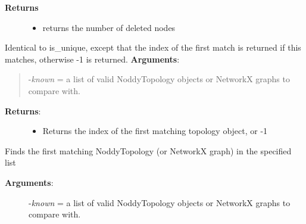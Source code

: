 \documentclass[a4paper,10pt,english]{sphinxmanual}
\begin{document}
\begin{fulllineitems}
\begin{fulllineitems}
\begin{description}
\begin{itemize}
\end{itemize}

\item[{\textbf{Returns}}] \leavevmode\begin{itemize}
\item {} 
returns the number of deleted nodes

\end{itemize}

\end{description}

\end{fulllineitems}


\begin{fulllineitems}
\label{pynoddy:pynoddy.output.NoddyTopology.find_first_match}
Identical to is\_unique, except that the index of the first match is returned if this matches, otherwise
-1 is returned.
\textbf{Arguments}:
\begin{quote}

-\emph{known} = a list of valid NoddyTopology objects or NetworkX graphs to compare with.
\end{quote}
\begin{description}
\item[{\textbf{Returns}:}] \leavevmode\begin{itemize}
\item {} 
Returns the index of the first matching topology object, or -1

\end{itemize}

\end{description}

\end{fulllineitems}


\begin{fulllineitems}
\label{pynoddy:pynoddy.output.NoddyTopology.find_matching}
Finds the first matching NoddyTopology (or NetworkX graph) in the specified list
\begin{description}
\item[{\textbf{Arguments}:}] \leavevmode
-\emph{known} = a list of valid NoddyTopology objects or NetworkX graphs to compare with.


\end{description}
\end{fulllineitems}
\end{fulllineitems}
\end{document}
